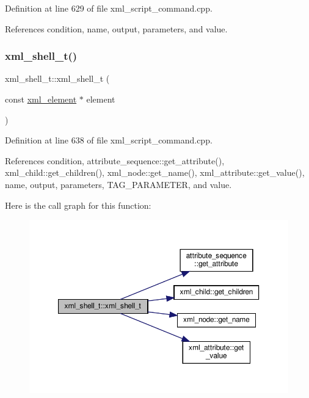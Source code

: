 Definition at line 629 of file xml\+\_\+script\+\_\+command.\+cpp.



References condition, name, output, parameters, and value.

\mbox{\label{classxml__shell__t_a583480ddfa2a59cd5e623106b48b7d4c}} 
\subsubsection{\texorpdfstring{xml\+\_\+shell\+\_\+t()}{xml\_shell\_t()}\hspace{0.1cm}{\footnotesize\ttfamily [2/2]}}
{\footnotesize\ttfamily xml\+\_\+shell\+\_\+t\+::xml\+\_\+shell\+\_\+t (\begin{DoxyParamCaption}\item[{const \hyperlink{classxml__element}{xml\+\_\+element} $\ast$}]{element }\end{DoxyParamCaption})\hspace{0.3cm}{\ttfamily [explicit]}}



Definition at line 638 of file xml\+\_\+script\+\_\+command.\+cpp.



References condition, attribute\+\_\+sequence\+::get\+\_\+attribute(), xml\+\_\+child\+::get\+\_\+children(), xml\+\_\+node\+::get\+\_\+name(), xml\+\_\+attribute\+::get\+\_\+value(), name, output, parameters, T\+A\+G\+\_\+\+P\+A\+R\+A\+M\+E\+T\+ER, and value.

Here is the call graph for this function\+:
\nopagebreak
\begin{figure}[H]
\begin{center}
\leavevmode
\includegraphics[width=350pt]{dc/d20/classxml__shell__t_a583480ddfa2a59cd5e623106b48b7d4c_cgraph}
\end{center}
\end{figure}
\mbox{\label{classxml__shell__t_aa6e37116b91269a26f1e9c2f0397752a}} 
